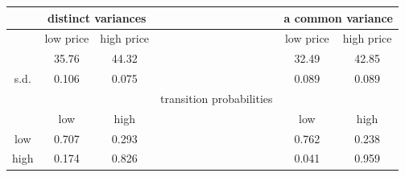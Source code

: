 \begin{tabular}{cccccc}
\toprule
&\multicolumn{2}{c}{distinct variances} & &\multicolumn{2}{c}{a common variance} \\
\midrule
& low price & high price & & low price & high price \\
 & 35.76 & 44.32 & & 32.49 & 42.85 \\
s.d. & 0.106 & 0.075 & & 0.089 & 0.089 \\
\midrule
& & & transition probabilities & & \\
& low & high & & low & high \\
low  & 0.707 & 0.293 & & 0.762 & 0.238 \\
high & 0.174 & 0.826 & & 0.041 & 0.959 \\
\bottomrule
\end{tabular}
